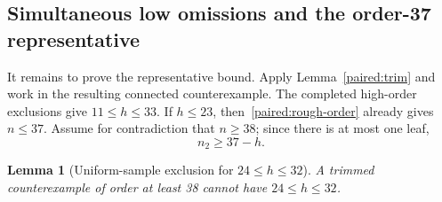\documentclass[11pt,a4paper]{article}
\newtheorem{lemma}[theorem]{Lemma}
\theoremstyle{definition}\newtheorem{definition}[theorem]{Definition}
\theoremstyle{remark}\newtheorem{remark}[theorem]{Remark}
\begin{document}
\subsection{Simultaneous low omissions and the order-37 representative}
\label{paired:order37-section}

It remains to prove the representative bound. Apply
Lemma~\ref{paired:trim} and work in the resulting connected
counterexample. The completed high-order exclusions give
$11\le h\le33$. If $h\le23$, then~\eqref{paired:rough-order} already
gives $n\le37$. Assume for contradiction that $n\ge38$; since
there is at most one leaf,
\begin{equation}\label{paired:n2-lower}
 n_2\ge37-h.
\end{equation}

\begin{lemma}[Uniform-sample exclusion for $24\le h\le32$]
\label{paired:order37-uniform}
A trimmed counterexample of order at least 38 cannot have
$24\le h\le32$.
\end{lemma}
\end{document}
